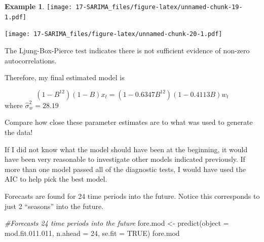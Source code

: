 \documentclass[
]{book}
\newenvironment{Shaded}{\begin{snugshade}}{\end{snugshade}}
\newcommand{\AttributeTok}[1]{\textcolor[rgb]{0.77,0.63,0.00}{#1}}
\newcommand{\CommentTok}[1]{\textcolor[rgb]{0.56,0.35,0.01}{\textit{#1}}}
\newcommand{\ConstantTok}[1]{\textcolor[rgb]{0.00,0.00,0.00}{#1}}
\newcommand{\DecValTok}[1]{\textcolor[rgb]{0.00,0.00,0.81}{#1}}
\newcommand{\FloatTok}[1]{\textcolor[rgb]{0.00,0.00,0.81}{#1}}
\newcommand{\FunctionTok}[1]{\textcolor[rgb]{0.00,0.00,0.00}{#1}}
\newcommand{\NormalTok}[1]{#1}
\newcommand{\OtherTok}[1]{\textcolor[rgb]{0.56,0.35,0.01}{#1}}
\newcommand{\SpecialCharTok}[1]{\textcolor[rgb]{0.00,0.00,0.00}{#1}}
\newcommand{\StringTok}[1]{\textcolor[rgb]{0.31,0.60,0.02}{#1}}
\theoremstyle{definition}
\theoremstyle{definition}
\newtheorem{example}{Example}[chapter]
\theoremstyle{definition}
\theoremstyle{definition}
\theoremstyle{remark}
\begin{document}
\begin{example}
\texttt{[image: 17-SARIMA\_files/figure-latex/unnamed-chunk-19-1.pdf]}

\begin{Shaded}
\end{Shaded}

\texttt{[image: 17-SARIMA\_files/figure-latex/unnamed-chunk-20-1.pdf]}

The Ljung-Box-Pierce test indicates there is not sufficient evidence of non-zero autocorrelations.

Therefore, my final estimated model is

\[(1-B^{12})(1-B)x_t=(1-0.6347B^{12})(1-0.4113B)w_t\]
where \(\hat \sigma_w^2=28.19\)

Compare how close these parameter estimates are to what was used to generate the data!

If I did not know what the model should have been at the beginning, it would have been very reasonable to investigate other models indicated previously. If more than one model passed all of the diagnostic tests, I would have used the AIC to help pick the best model.

Forecasts are found for 24 time periods into the future. Notice this corresponds to just 2 ``seasons'' into the future.

\begin{Shaded}
\begin{Highlighting}[]
\CommentTok{\#Forecasts 24 time periods into the future}
\NormalTok{fore.mod }\OtherTok{\textless{}{-}} \FunctionTok{predict}\NormalTok{(}\AttributeTok{object =}\NormalTok{ mod.fit.}\FloatTok{011.011}\NormalTok{, }\AttributeTok{n.ahead =} 
    \DecValTok{24}\NormalTok{, }\AttributeTok{se.fit =} \ConstantTok{TRUE}\NormalTok{) }
\NormalTok{fore.mod}
\end{Highlighting}
\end{Shaded}


\end{example}
\end{document}
